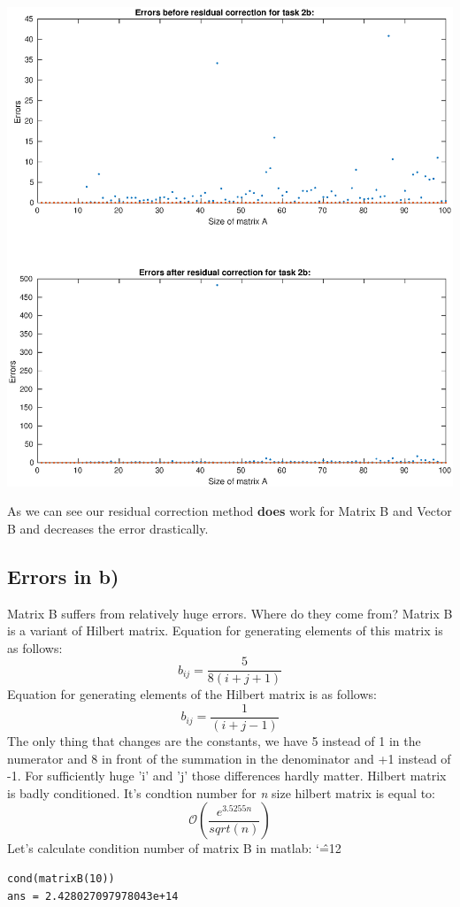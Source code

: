 \documentclass[12pt]{report}
\newenvironment{simplechar}{%
   \catcode`\^=12
}{}
\begin{document}
\begin{center}
   \includegraphics[scale=0.75]{errorsB.eps}
\end{center}
As we can see our residual correction method \textbf{does} work for Matrix B and Vector B and decreases the error drastically.

\subsection{Errors in b)}
Matrix B suffers from relatively huge errors. Where do they come from?
Matrix B is a variant of Hilbert matrix.
Equation for generating elements of this matrix is as follows:
\[ b_{ij} = \frac{5}{8(i + j + 1)} \]
Equation for generating elements of the Hilbert matrix is as follows:
\[ b_{ij} = \frac{1}{(i + j - 1)} \]
The only thing that changes are the constants, we have 5 instead of 1 in the numerator and 8 in front of the summation in the denominator and +1 instead of -1. For sufficiently huge 'i' and 'j' those differences hardly matter.
Hilbert matrix is badly conditioned. It's condtion number for \textit{n} size hilbert matrix is equal to:
\[ \mathcal{O}(\frac{e^{3.5255n}}{sqrt(n)}) \]
Let's calculate condition number of matrix B in matlab:
\begin{simplechar}
\begin{lstlisting}
cond(matrixB(10))
ans = 2.428027097978043e+14
\end{lstlisting}
\end{simplechar}
\end{document}
